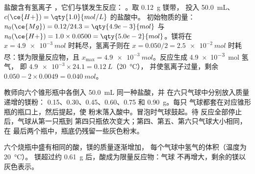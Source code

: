 \begin{example}[盐酸中的镁]\label{ex:g10:reaction-progress-table:magnesium}
盐酸含有氢离子 ，它们与镁发生反应：
。取 \qty{0.12}{g} 镁带，
投入 \qty{50.0}{mL}、$c(\ce{H+}) = \qty{1.0}{mol/L}$ 的盐酸中。
初始物质的量：$n_0(\ce{Mg}) = 0.12/24.3 = \qty{4.9e-3}{mol}$ 与
$n_0(\ce{H+}) = 1.0 \times 0.0500 = \qty{5.0e-2}{mol}$。镁将在
$x = \qty{4.9e-3}{mol}$ 时耗尽，氢离子则在
$x = 0.050/2 = \qty{2.5e-2}{mol}$ 时耗尽：镁为限量反应物，且
$x_{\max} = \qty{4.9e-3}{mol}$。反应生成 \qty{4.9e-3}{mol} 氢气，
即 $\num{4.9e-3} \times 24.1 = \qty{0.12}{L}$（\qty{20}{\celsius}），
并使氢离子过量，剩余 $0.050 - 2 \times 0.0049 =
\qty{0.040}{mol}$。
\end{example}

\begin{inthelab}[锥形瓶上的气球]
教师向六个锥形瓶中各倒入 \qty{50.0}{mL} 同一种盐酸，并
在六只气球中分别放入质量递增的镁粉：
0.15、0.30、0.45、0.60、0.75 和 \qty{0.90}{g}。每只
气球都套在对应锥形瓶的瓶口上，然后提起，使
粉末落入酸中。冒泡时气球鼓起。待
反应全部停止后，气球从第一只瓶到
第四只瓶依次变大；第四、第五、第六只气球大小相同，在
最后两个瓶中，瓶底仍残留一些灰色粉末。
\end{inthelab}

\begin{omfigure}

{\small 六个烧瓶中盛有相同的酸，镁的质量逐渐增加，
每个气球中氢气的体积（温度为 \qty{20}{\celsius}）。
镁超过约 \qty{0.61}{g} 后，酸成为限量反应物：气球
不再增大，剩余的镁以灰色表示。}
\end{omfigure}


